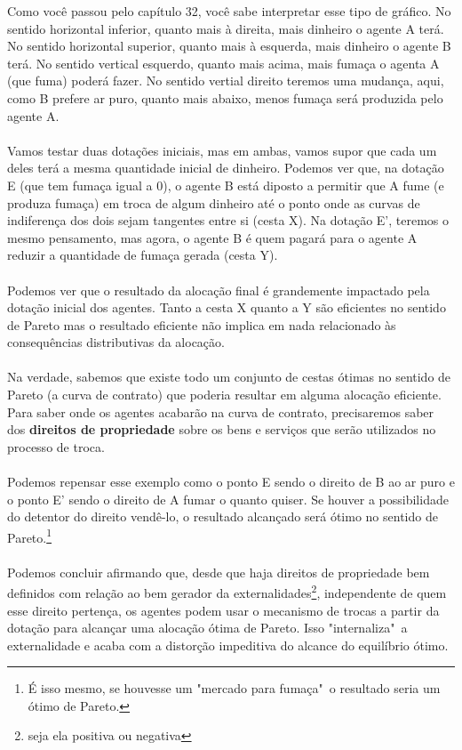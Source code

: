 \documentclass[a4paper,11pt,oneside]{book}
\theoremstyle{definition}
\theoremstyle{break}
\begin{document}
Como você passou pelo capítulo 32, você sabe interpretar esse tipo de gráfico. No sentido horizontal inferior, quanto mais à direita, mais dinheiro o agente A terá. No sentido horizontal superior, quanto mais à esquerda, mais dinheiro o agente B terá. No sentido vertical esquerdo, quanto mais acima, mais fumaça o agenta A (que fuma) poderá fazer. No sentido vertial direito teremos uma mudança, aqui, como B prefere ar puro, quanto mais abaixo, menos fumaça será produzida pelo agente A.
\\
\\
Vamos testar duas dotações iniciais, mas em ambas, vamos supor que cada um deles terá a mesma quantidade inicial de dinheiro. Podemos ver que, na dotação E (que tem fumaça igual a 0), o agente B está diposto a permitir que A fume (e produza fumaça) em troca de algum dinheiro até o ponto onde as curvas de indiferença dos dois sejam tangentes entre si (cesta X). Na dotação E', teremos o mesmo pensamento, mas agora, o agente B é quem pagará para o agente A reduzir a quantidade de fumaça gerada (cesta Y).
\\
\\
Podemos ver que o resultado da alocação final é grandemente impactado pela dotação inicial dos agentes. Tanto a cesta X quanto a Y são eficientes no sentido de Pareto mas o resultado eficiente não implica em nada relacionado às consequências distributivas da alocação.
\\
\\
Na verdade, sabemos que existe todo um conjunto de cestas ótimas no sentido de Pareto (a curva de contrato) que poderia resultar em alguma alocação eficiente. Para saber onde os agentes acabarão na curva de contrato, precisaremos saber dos \textbf{direitos de propriedade} sobre os bens e serviços que serão utilizados no processo de troca.
\\
\\
Podemos repensar esse exemplo como o ponto E sendo o direito de B ao ar puro e o ponto E' sendo o direito de A fumar o quanto quiser. Se houver a possibilidade do detentor do direito vendê-lo, o resultado alcançado será ótimo no sentido de Pareto.\footnote{É isso mesmo, se houvesse um "mercado para fumaça"\ o resultado seria um ótimo de Pareto.}
\\
\\
Podemos concluir afirmando que, desde que haja direitos de propriedade bem definidos com relação ao bem gerador da externalidades\footnote{seja ela positiva ou negativa}, independente de quem esse direito pertença, os agentes podem usar o mecanismo de trocas a partir da dotação para alcançar uma alocação ótima de Pareto. Isso "internaliza"\ a externalidade e acaba com a distorção impeditiva do alcance do equilíbrio ótimo.
\end{document}
